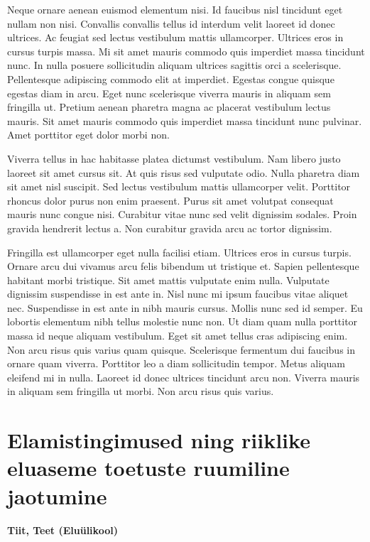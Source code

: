 \documentclass[]{book}
\begin{document}
Neque ornare aenean euismod elementum nisi. Id faucibus nisl tincidunt eget nullam non nisi. Convallis convallis tellus id interdum velit laoreet id donec ultrices. Ac feugiat sed lectus vestibulum mattis ullamcorper. Ultrices eros in cursus turpis massa. Mi sit amet mauris commodo quis imperdiet massa tincidunt nunc. In nulla posuere sollicitudin aliquam ultrices sagittis orci a scelerisque. Pellentesque adipiscing commodo elit at imperdiet. Egestas congue quisque egestas diam in arcu. Eget nunc scelerisque viverra mauris in aliquam sem fringilla ut. Pretium aenean pharetra magna ac placerat vestibulum lectus mauris. Sit amet mauris commodo quis imperdiet massa tincidunt nunc pulvinar. Amet porttitor eget dolor morbi non.

Viverra tellus in hac habitasse platea dictumst vestibulum. Nam libero justo laoreet sit amet cursus sit. At quis risus sed vulputate odio. Nulla pharetra diam sit amet nisl suscipit. Sed lectus vestibulum mattis ullamcorper velit. Porttitor rhoncus dolor purus non enim praesent. Purus sit amet volutpat consequat mauris nunc congue nisi. Curabitur vitae nunc sed velit dignissim sodales. Proin gravida hendrerit lectus a. Non curabitur gravida arcu ac tortor dignissim.

Fringilla est ullamcorper eget nulla facilisi etiam. Ultrices eros in cursus turpis. Ornare arcu dui vivamus arcu felis bibendum ut tristique et. Sapien pellentesque habitant morbi tristique. Sit amet mattis vulputate enim nulla. Vulputate dignissim suspendisse in est ante in. Nisl nunc mi ipsum faucibus vitae aliquet nec. Suspendisse in est ante in nibh mauris cursus. Mollis nunc sed id semper. Eu lobortis elementum nibh tellus molestie nunc non. Ut diam quam nulla porttitor massa id neque aliquam vestibulum. Eget sit amet tellus cras adipiscing enim. Non arcu risus quis varius quam quisque. Scelerisque fermentum dui faucibus in ornare quam viverra. Porttitor leo a diam sollicitudin tempor. Metus aliquam eleifend mi in nulla. Laoreet id donec ultrices tincidunt arcu non. Viverra mauris in aliquam sem fringilla ut morbi. Non arcu risus quis varius.

\hypertarget{chapter21}{%
\section{Elamistingimused ning riiklike eluaseme toetuste ruumiline jaotumine}\label{chapter21}}

\begin{authors}
\textbf{Tiit, Teet (Eluülikool)}
\end{authors}
\end{document}
